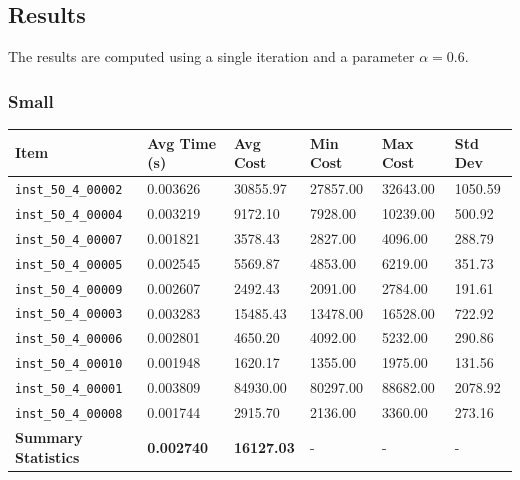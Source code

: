 \documentclass{article}
\begin{document}
\subsection*{Results}
The results are computed using a single iteration and a parameter $\alpha = 0.6$.

\subsubsection*{Small}

\begin{table}[H]
\centering
\hspace*{-1.5cm}
\begin{tabular}{llllll}
\toprule
\textbf{Item} & \textbf{Avg Time (s)} & \textbf{Avg Cost} & \textbf{Min Cost} & \textbf{Max Cost} & \textbf{Std Dev} \\
\midrule
\texttt{inst\_50\_4\_00002} & 0.003626 & 30855.97 & 27857.00 & 32643.00 & 1050.59 \\
\texttt{inst\_50\_4\_00004} & 0.003219 & 9172.10  & 7928.00  & 10239.00 & 500.92  \\
\texttt{inst\_50\_4\_00007} & 0.001821 & 3578.43  & 2827.00  & 4096.00  & 288.79  \\
\texttt{inst\_50\_4\_00005} & 0.002545 & 5569.87  & 4853.00  & 6219.00  & 351.73  \\
\texttt{inst\_50\_4\_00009} & 0.002607 & 2492.43  & 2091.00  & 2784.00  & 191.61  \\
\texttt{inst\_50\_4\_00003} & 0.003283 & 15485.43 & 13478.00 & 16528.00 & 722.92  \\
\texttt{inst\_50\_4\_00006} & 0.002801 & 4650.20  & 4092.00  & 5232.00  & 290.86  \\
\texttt{inst\_50\_4\_00010} & 0.001948 & 1620.17  & 1355.00  & 1975.00  & 131.56  \\
\texttt{inst\_50\_4\_00001} & 0.003809 & 84930.00 & 80297.00 & 88682.00 & 2078.92 \\
\texttt{inst\_50\_4\_00008} & 0.001744 & 2915.70  & 2136.00  & 3360.00  & 273.16  \\
\midrule
\textbf{Summary Statistics} & \textbf{0.002740} & \textbf{16127.03} & - & - & - \\
\bottomrule
\end{tabular}
\label{tab:performance_metrics_randomized}
\end{table}
\end{document}

